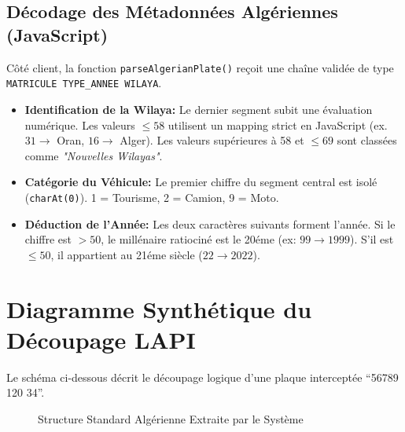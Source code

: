 \documentclass[11pt,a4paper]{article}
\begin{document}
\subsection{D\'ecodage des M\'etadonn\'ees Alg\'eriennes (JavaScript)}
C\^ot\'e client, la fonction \texttt{parseAlgerianPlate()} re\c{c}oit une cha\^ine valid\'ee de type \texttt{MATRICULE TYPE\_ANNEE WILAYA}.

\begin{itemize}
    \item \textbf{Identification de la Wilaya:} Le dernier segment subit une \'evaluation num\'erique. Les valeurs $\le 58$ utilisent un mapping strict en JavaScript (ex. $31 \rightarrow$ Oran, $16 \rightarrow$ Alger). Les valeurs sup\'erieures \`a 58 et $\le 69$ sont class\'ees comme \textit{"Nouvelles Wilayas"}.
    \item \textbf{Cat\'egorie du V\'ehicule:} Le premier chiffre du segment central est isol\'e (\texttt{charAt(0)}). 1 = Tourisme, 2 = Camion, 9 = Moto.
    \item \textbf{D\'eduction de l'Ann\'ee:} Les deux caract\`eres suivants forment l'ann\'ee. Si le chiffre est $> 50$, le mill\'enaire ratiocin\'e est le 20\'eme (ex: $99 \rightarrow 1999$). S'il est $\le 50$, il appartient au 21\'eme si\`ecle ($22 \rightarrow 2022$).
\end{itemize}

\section{Diagramme Synth\'etique du D\'ecoupage LAPI}
Le sch\'ema ci-dessous d\'ecrit le d\'ecoupage logique d'une plaque intercept\'ee ``56789 120 34''.

\begin{figure}[htbp]
\centering
{}
\caption{Structure Standard Alg\'erienne Extraite par le Syst\`eme}
\label{fig:plate_split}
\end{figure}
\end{document}
